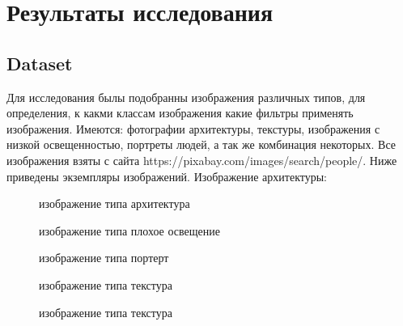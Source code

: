 \section{Результаты исследования}
\subsection{Dataset}
Для исследования былы подобранны изображения различных типов, для определения, к какми классам изображения
какие фильтры применять изображения. Имеются: фотографии архитектуры, текстуры, изображения с низкой освещенностью, портреты людей, а так же комбинация некоторых. Все изображения взяты с сайта https://pixabay.com/images/search/people/. Ниже приведены экземпляры изображений.
Изображение архитектуры:
\begin{figure}[h]
	\caption{изображение типа архитектура}
	\label{fig:Architecture}
\end{figure}
\begin{figure}[h]
	\caption{изображение типа плохое освещение}
	\label{fig:Night}
\end{figure}
\begin{figure}[h]
	\caption{изображение типа портерт}
	\label{fig:Man}
\end{figure}
\begin{figure}[h]
	\caption{изображение типа текстура}
	\label{fig:Texture}
\end{figure}
\begin{figure}[h]
	\caption{изображение типа текстура}
	\label{fig:Guy}
\end{figure}